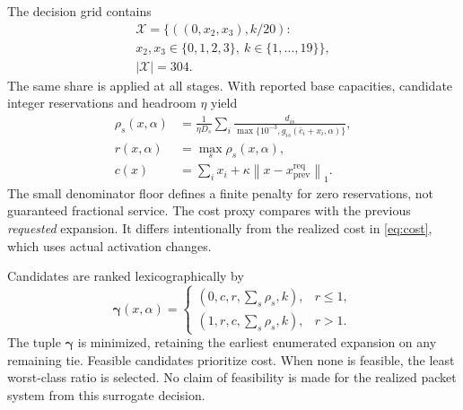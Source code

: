 \documentclass{IEEEoj}
\newcommand{\norm}[1]{\left\lVert#1\right\rVert_1}
\begin{document}
The decision grid contains
\begin{equation}
 \begin{gathered}\mathcal X=\{((0,x_2,x_3),k/20):\\ x_2,x_3\in\{0,1,2,3\},\ k\in\{1,\ldots,19\}\},\\|\mathcal X|=304.\end{gathered}
\end{equation}
The same share is applied at all stages. With reported base capacities,
candidate integer reservations and headroom $\eta$ yield
\begin{align}
 \rho_s(x,\alpha)&=\frac1{\eta D_s}\sum_i
 \frac{d_{is}}{\max\{10^{-3},g_{is}(\bar c_i+x_i,\alpha)\}},\\
 r(x,\alpha)&=\max_s\rho_s(x,\alpha),\\
 c(x)&=\sum_i x_i+\kappa\norm{x-x^{\mathrm{req}}_{\mathrm{prev}}}.\label{eq:proxycost}
\end{align}
The small denominator floor defines a finite penalty for zero reservations,
not guaranteed fractional service. The cost proxy compares with the previous
\emph{requested} expansion. It differs intentionally from the realized cost in
\eqref{eq:cost}, which uses actual activation changes.

Candidates are ranked lexicographically by
\begin{equation}
 \boldsymbol{\gamma}(x,\alpha)=
 \begin{cases}
 (0,c,r,\sum_s\rho_s,k), & r\le1,\\
 (1,r,c,\sum_s\rho_s,k), & r>1.
 \end{cases}\label{eq:ranking}
\end{equation}
The tuple $\boldsymbol{\gamma}$ is minimized, retaining the earliest enumerated expansion on any
remaining tie. Feasible candidates prioritize cost. When none is feasible,
the least worst-class ratio is selected. No claim of feasibility is made for
the realized packet system from this surrogate decision.
\end{document}
